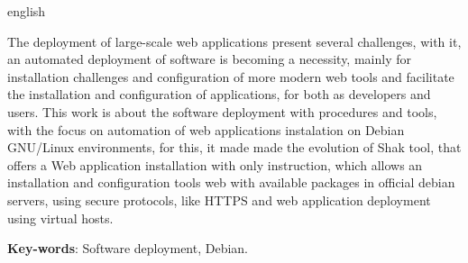 \begin{resumo}[Abstract]
 \begin{otherlanguage*}{english}

   The deployment of large-scale web applications present several challenges, with
   it, an automated deployment of software is becoming a necessity, mainly for
   installation challenges and configuration of more modern web tools and
   facilitate the installation and configuration of applications, for both as
   developers and users. This work is about the software deployment with procedures
   and tools, with the focus on automation of web applications instalation on
   Debian GNU/Linux environments,
   for this, it made made the evolution of Shak tool, that offers a Web
   application installation with only instruction, which allows an installation
   and configuration tools web with available packages in official debian servers,
   using secure protocols, like HTTPS and web application deployment using virtual hosts.
   \vspace{\onelineskip}

   \noindent
   \textbf{Key-words}: Software deployment, Debian.
 \end{otherlanguage*}
\end{resumo}
